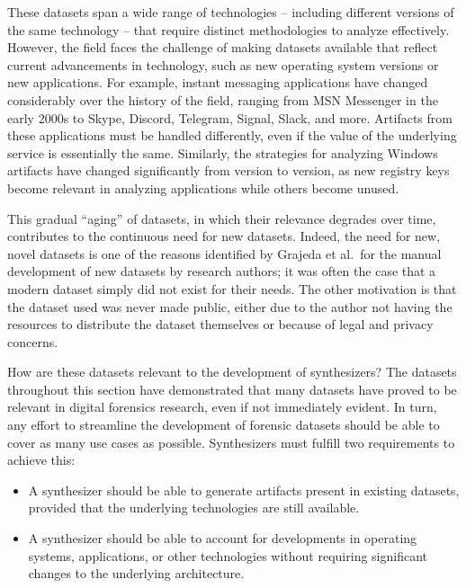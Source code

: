 \documentclass[letterpaper,12pt]{report}
\def\tightlist{}
\begin{document}
These datasets span a wide range of technologies -- including different
versions of the same technology -- that require distinct methodologies
to analyze effectively. However, the field faces the challenge of making
datasets available that reflect current advancements in technology, such
as new operating system versions or new applications. For example,
instant messaging applications have changed considerably over the
history of the field, ranging from MSN Messenger in the early 2000s to
Skype, Discord, Telegram, Signal, Slack, and more. Artifacts from these
applications must be handled differently, even if the value of the
underlying service is essentially the same. Similarly, the strategies
for analyzing Windows artifacts have changed significantly from version
to version, as new registry keys become relevant in analyzing
applications while others become unused.

This gradual ``aging'' of datasets, in which their relevance degrades
over time, contributes to the continuous need for new datasets. Indeed,
the need for new, novel datasets is one of the reasons identified by
Grajeda et al.~for the manual development of new datasets by research
authors; it was often the case that a modern dataset simply did not
exist for their needs. The other motivation is that the dataset used was
never made public, either due to the author not having the resources to
distribute the dataset themselves or because of legal and privacy
concerns.

How are these datasets relevant to the development of synthesizers? The
datasets throughout this section have demonstrated that many datasets
have proved to be relevant in digital forensics research, even if not
immediately evident. In turn, any effort to streamline the development
of forensic datasets should be able to cover as many use cases as
possible. Synthesizers must fulfill two requirements to achieve this:

\begin{itemize}
\tightlist
\item
  A synthesizer should be able to generate artifacts present in existing
  datasets, provided that the underlying technologies are still
  available.
\item
  A synthesizer should be able to account for developments in operating
  systems, applications, or other technologies without requiring
  significant changes to the underlying architecture.
\end{itemize}
\end{document}
